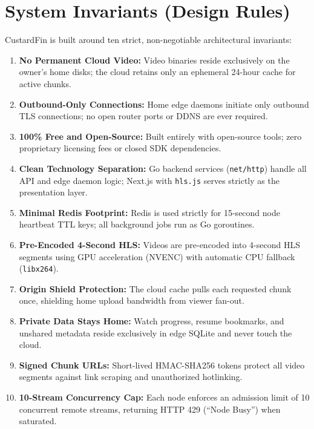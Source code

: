 \section{System Invariants (Design Rules)}
\label{sec:invariants}

CustardFin is built around ten strict, non-negotiable architectural invariants:

\begin{enumerate}
    \item \textbf{No Permanent Cloud Video:} Video binaries reside exclusively on the owner's home disks; the cloud retains only an ephemeral 24-hour cache for active chunks.
    \item \textbf{Outbound-Only Connections:} Home edge daemons initiate only outbound TLS connections; no open router ports or DDNS are ever required.
    \item \textbf{100\% Free and Open-Source:} Built entirely with open-source tools; zero proprietary licensing fees or closed SDK dependencies.
    \item \textbf{Clean Technology Separation:} Go backend services (\texttt{net/http}) handle all API and edge daemon logic; Next.js with \texttt{hls.js} serves strictly as the presentation layer.
    \item \textbf{Minimal Redis Footprint:} Redis is used strictly for 15-second node heartbeat TTL keys; all background jobs run as Go goroutines.
    \item \textbf{Pre-Encoded 4-Second HLS:} Videos are pre-encoded into 4-second HLS segments using GPU acceleration (NVENC) with automatic CPU fallback (\texttt{libx264}).
    \item \textbf{Origin Shield Protection:} The cloud cache pulls each requested chunk once, shielding home upload bandwidth from viewer fan-out.
    \item \textbf{Private Data Stays Home:} Watch progress, resume bookmarks, and unshared metadata reside exclusively in edge SQLite and never touch the cloud.
    \item \textbf{Signed Chunk URLs:} Short-lived HMAC-SHA256 tokens protect all video segments against link scraping and unauthorized hotlinking.
    \item \textbf{10-Stream Concurrency Cap:} Each node enforces an admission limit of 10 concurrent remote streams, returning HTTP 429 (``Node Busy'') when saturated.
\end{enumerate}

